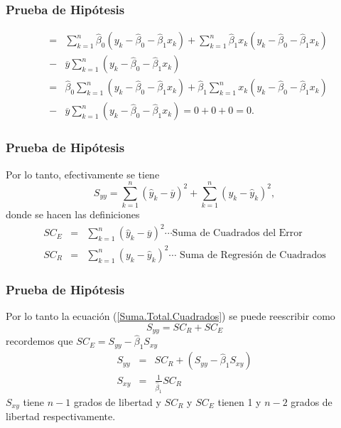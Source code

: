 \documentclass{beamer}
\begin{document}
\begin{frame}\frametitle{Prueba de Hip\'otesis}
\begin{eqnarray*}
&=&\sum_{k=1}^{n}\hat{\beta}_{0}\left(y_{k}-\hat{\beta}_{0}-\hat{\beta}_{1}x_{k}\right)+\sum_{k=1}^{n}\hat{\beta}_{1}x_{k}\left(y_{k}-\hat{\beta}_{0}-\hat{\beta}_{1}x_{k}\right)\\
&-&\overline{y}\sum_{k=1}^{n}\left(y_{k}-\hat{\beta}_{0}-\hat{\beta}_{1}x_{k}\right)\\
&=&\hat{\beta}_{0}\sum_{k=1}^{n}\left(y_{k}-\hat{\beta}_{0}-\hat{\beta}_{1}x_{k}\right)+\hat{\beta}_{1}\sum_{k=1}^{n}x_{k}\left(y_{k}-\hat{\beta}_{0}-\hat{\beta}_{1}x_{k}\right)\\
&-&\overline{y}\sum_{k=1}^{n}\left(y_{k}-\hat{\beta}_{0}-\hat{\beta}_{1}x_{k}\right)=0+0+0=0.
\end{eqnarray*}
\end{frame}

\begin{frame}\frametitle{Prueba de Hip\'otesis}
Por lo tanto, efectivamente se tiene
\begin{equation}\label{Suma.Total.Cuadrados}
S_{yy}=\sum_{k=1}^{n}\left(\hat{y}_{k}-\overline{y}\right)^{2}+\sum_{k=1}^{n}\left(y_{k}-\hat{y}_{k}\right)^{2},
\end{equation}
donde se hacen las definiciones
\begin{eqnarray}
SC_{E}&=&\sum_{k=1}^{n}\left(\hat{y}_{k}-\overline{y}\right)^{2}\cdots\textrm{Suma de Cuadrados del Error}\\
SC_{R}&=&\sum_{k=1}^{n}\left(y_{k}-\hat{y}_{k}\right)^{2}\cdots\textrm{ Suma de Regresi\'on de Cuadrados}
\end{eqnarray}
\end{frame}

\begin{frame}\frametitle{Prueba de Hip\'otesis}
Por lo tanto la ecuaci\'on (\ref{Suma.Total.Cuadrados}) se puede reescribir como 
\begin{equation}\label{Suma.Total.Cuadrados.Dos}
S_{yy}=SC_{R}+SC_{E}
\end{equation}
recordemos que $SC_{E}=S_{yy}-\hat{\beta}_{1}S_{xy}$
\begin{eqnarray*}
S_{yy}&=&SC_{R}+\left( S_{yy}-\hat{\beta}_{1}S_{xy}\right)\\
S_{xy}&=&\frac{1}{\hat{\beta}_{1}}SC_{R}
\end{eqnarray*}
$S_{xy}$ tiene $n-1$ grados de libertad y $SC_{R}$ y $SC_{E}$ tienen 1 y $n-2$ grados de libertad respectivamente.
\end{frame}
\end{document}
